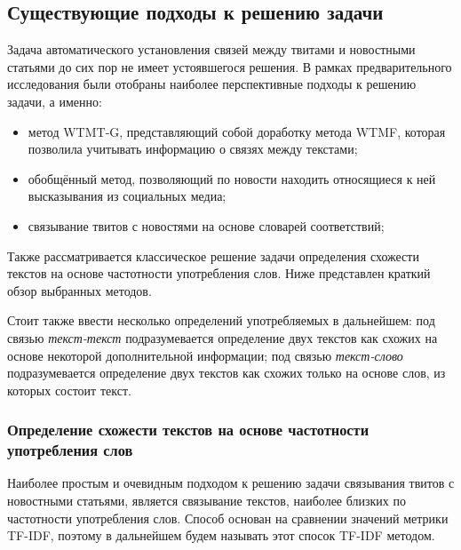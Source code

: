 \subsection{Существующие подходы к решению задачи}
    Задача автоматического установления связей между твитами и новостными статьями до сих пор не имеет устоявшегося решения.
    В рамках предварительного исследования были отобраны наиболее перспективные подходы к решению задачи, а именно:
    \begin{itemize}
        \item метод WTMT-G, представляющий собой доработку метода WTMF, которая позволила учитывать информацию о связях между текстами;
        \item обобщённый метод, позволяющий по новости находить относящиеся к ней высказывания из социальных медиа;
        \item связывание твитов с новостями на основе словарей соответствий;
    \end{itemize}
    Также рассматривается классическое решение задачи определения схожести текстов на основе частотности употребления слов.
    Ниже представлен краткий обзор выбранных методов.

    Стоит также ввести несколько определений употребляемых в дальнейшем:
    под связью \textit{текст-текст} подразумевается определение двух текстов как схожих на основе некоторой дополнительной информации;
    под связью \textit{текст-слово} подразумевается определение двух текстов как схожих только на основе слов, из которых состоит текст.

    \subsubsection{Определение схожести текстов на основе частотности употребления слов}
        Наиболее простым и очевидным подходом к решению задачи связывания твитов с новостными статьями, является связывание текстов,
        наиболее близких по частотности употребления слов. Способ основан на сравнении значений метрики TF-IDF, поэтому в дальнейшем будем называть этот спосок TF-IDF методом.

